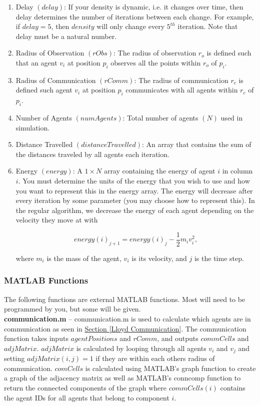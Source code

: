 \documentclass[../CourseManual.tex]{subfiles}
\begin{document}
\begin{enumerate}
  \item Delay $(delay)$: If your density is dynamic, i.e. it changes over time, then delay determines the number of iterations between each change. For example, if $delay = 5$, then $density$ will only change every $5^{th}$ iteration. Note that delay must be a natural number.
  
  \item Radius of Observation $(rObs)$: The radius of observation $r_o$ is defined such that an agent $v_i$ at position $p_i$ observes all the points within $r_o$ of $p_i$.
  
  \item Radius of Communication $(rComm)$: The radius of communication $r_c$ is defined such  agent $v_i$ at position $p_i$ communicates with all agents within $r_c$ of $p_i$.
  
  \item Number of Agents $(numAgents)$: Total number of agents $(N)$ used in simulation.
  
  \item Distance Travelled $(distanceTravelled)$: An array that contains the sum of the distances traveled by all agents each iteration.
  
  \item Energy $(energy)$: A $1 \times N$ array containing the energy of agent $i$ in column $i$. You must determine the units of the energy that you wish to use and how you want to represent this in the energy array. The energy will decrease after every iteration by some parameter (you may choose how to represent this). In the regular algorithm, we decrease the energy of each agent depending on the velocity they move at with
  
  $$energy(i)_{j+1} = energy(i)_j - \dfrac{1}{2}m_i v_i^2,$$
  
  where $m_i$ is the mass of the agent, $v_i$ is its velocity, and $j$ is the time step.
  
\end{enumerate}

\subsubsection{MATLAB Functions} \label{MATLAB Functions: Lloyd}
The following functions are external MATLAB functions. Most will need to be programmed by you, but some will be given. \\

\textbf{communication.m} -- communication.m is used to calculate which agents are in communication as seen in \hyperref[Lloyd Communication]{Section \ref{Lloyd Communication}}. The communication function takes inputs $agentPositions$ and $rComm$, and outputs $commCells$ and $adjMatrix$. $adjMatrix$ is calculated by looping through all agents $v_i$ and $v_j$ and setting $adjMatrix(i,j) = 1$ if they are within each others radius of communication. $comCells$ is calculated using MATLAB's graph function to create a graph of the adjacency matrix as well as MATLAB's conncomp function to return the connected components of the graph where $commCells(i)$ contains the agent IDs for all agents that belong to component $i$. \\
\end{document}
